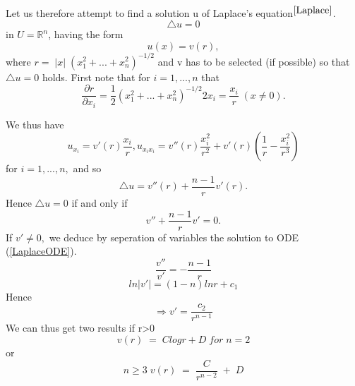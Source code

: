 \documentclass[a4paper,10pt]{article}
\numberwithin{equation}{section}
\numberwithin{figure}{section}
\theoremstyle{plain}
\begin{document}
\paragraph{} Let us therefore attempt to find a solution u of Laplace's equation$^{\ref{Laplace}}$.
\begin{equation}\label{Laplace}
 \bigtriangleup u = 0
\end{equation}
in $U=\mathbb{R}^{n}$, having the form
\begin{displaymath}
 u(x) = v(r),
\end{displaymath}
where $r=\; |x|\;(x^{2}_{1}+...+x^{2}_{n})^{-1/2}$
and v has to be selected (if possible) so that $\bigtriangleup u = 0$ holds.
First note that for $i=1,...,n$ that
\begin{displaymath}\frac{\partial r}{\partial x_{i}}=\frac{1}{2}(x^{2}_{1}+...+x^{2}_{n})^{-1/2}2x_{i}=\frac{x_{i}}{r}\;(x\neq 0).\end{displaymath}

We thus have
\begin{displaymath}
 u_{x_{i}}=v'(r)\frac{x_{i}}{r},u_{x_{i}x_{i}} = v''(r)\frac{x^{2}_{i}}{r^{2}}+v'(r)\left(\frac{1}{r}-
\frac{x^{2}_{i}}{r^{3}}\right)
\end{displaymath}
for $i=1,...,n,$ and so 
\begin{displaymath}
 \bigtriangleup u = v''(r)+\frac{n-1}{r}v'(r).
\end{displaymath}
Hence $\bigtriangleup u = 0$ if and only if
\begin{equation}\label{LaplaceODE}
 v'' + \frac{n-1}{r}v' = 0.
\end{equation}
If $v' \neq 0,$ we deduce by seperation of variables the solution to ODE (\ref{LaplaceODE}).
\begin{displaymath}
 \frac{v''}{v'}=-\frac{n-1}{r}
\end{displaymath}
\begin{displaymath}
 ln|v'|=(1-n)ln r + c_{1}
\end{displaymath}
Hence \begin{displaymath}
       \Rightarrow v'=\frac{c_{2}}{r^{n-1}}
      \end{displaymath}
We can thus get two results if r>0
\begin{displaymath}
 v(r)\; = \; C log r + D\; for\; n=2
\end{displaymath}
or
\begin{displaymath}
 n\geq 3 \; v(r)\;=\; \frac{C}{r^{n-2}}\; +\; D
\end{displaymath}
\end{document}
